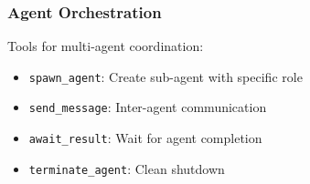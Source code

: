 \subsubsection{Agent Orchestration}

Tools for multi-agent coordination:
\begin{itemize}
    \item \texttt{spawn\_agent}: Create sub-agent with specific role
    \item \texttt{send\_message}: Inter-agent communication
    \item \texttt{await\_result}: Wait for agent completion
    \item \texttt{terminate\_agent}: Clean shutdown
\end{itemize}

